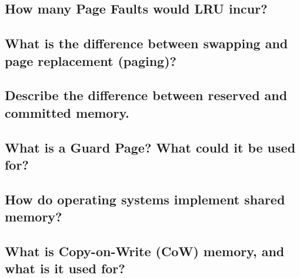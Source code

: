 \subsection{How many Page Faults would LRU incur?}

\subsection{What is the difference between swapping and page replacement (paging)?}

\subsection{Describe the difference between reserved and committed memory.}

\subsection{What is a Guard Page? What could it be used for?}

\subsection{How do operating systems implement shared memory?}

\subsection{What is Copy-on-Write (CoW) memory, and what is it used for?}
